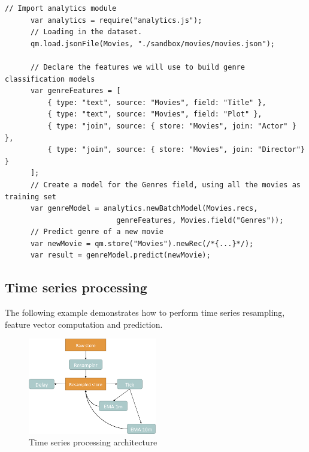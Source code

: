 \documentclass{article} %
\begin{document}
      \begin{lstlisting}[caption={Text mining: storage, feature extraction, classification and regression}] 	
      // Import analytics module
      var analytics = require("analytics.js");
      // Loading in the dataset.
      qm.load.jsonFile(Movies, "./sandbox/movies/movies.json");
       	
      // Declare the features we will use to build genre classification models
      var genreFeatures = [
          { type: "text", source: "Movies", field: "Title" },
          { type: "text", source: "Movies", field: "Plot" },
          { type: "join", source: { store: "Movies", join: "Actor" } },
          { type: "join", source: { store: "Movies", join: "Director"} }
      ];
      // Create a model for the Genres field, using all the movies as training set 
      var genreModel = analytics.newBatchModel(Movies.recs,
                          genreFeatures, Movies.field("Genres"));
      // Predict genre of a new movie
      var newMovie = qm.store("Movies").newRec(/*{...}*/);
      var result = genreModel.predict(newMovie);
      \end{lstlisting}

   \subsection{Time series processing}
      The following example demonstrates how to perform time series resampling, feature vector computation and prediction.

      \begin{figure}[h]
      \begin{center}
      \includegraphics[width=0.5\textwidth]{timeSeries.png}
      \end{center}
      \caption{Time series processing architecture}
      \end{figure}
\end{document}
